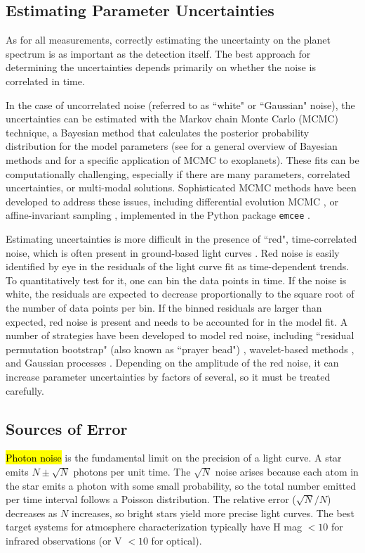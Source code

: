 \documentclass[graybox,natbib,nosecnum]{svmult}
\newcommand{\hbindex}[1]{\hl{#1}\index{#1}}  %
\begin{document}
\subsection{Estimating Parameter Uncertainties}
As for all measurements, correctly estimating the uncertainty on the planet spectrum is as important as the detection itself.  The best approach for determining the uncertainties depends primarily on whether the noise is correlated in time.  

In the case of uncorrelated noise (referred to as ``white" or ``Gaussian" noise), the uncertainties can be estimated with the Markov chain Monte Carlo (MCMC) technique, a Bayesian method that calculates the posterior probability distribution for the model parameters (see \citealt{sivia96} for a general overview of Bayesian methods and \citealt{ford05} for a specific application of MCMC to exoplanets). These fits can be computationally challenging, especially if there are many parameters, correlated uncertainties, or multi-modal solutions. Sophisticated MCMC methods have been developed to address these issues, including differential evolution MCMC \citep{braak06}, or affine-invariant sampling \citep{goodman10}, implemented in the Python package \texttt{emcee} \citep{foremanmackey13}.

Estimating uncertainties is more difficult in the presence of ``red", time-correlated noise, which is often present in ground-based light curves \citep{}. Red noise is easily identified by eye in the residuals of the light curve fit as time-dependent trends. To quantitatively test for it, one can bin the data points in time. If the noise is white, the residuals are expected to decrease proportionally to the square root of the number of data points per bin. If the binned residuals are larger than expected, red noise is present and needs to be accounted for in the model fit.  A number of strategies have been developed to model red noise, including ``residual permutation bootstrap" (also known as ``prayer bead")  \citep{southworth08}, wavelet-based methods \citep{carter09}, and Gaussian processes \citep{rasmussen05}. Depending on the amplitude of the red noise, it can increase parameter uncertainties by factors of several, so it must be treated carefully.

\subsection{Sources of Error}

\hbindex{Photon noise} is the fundamental limit on the precision of a light curve. A star emits $N \pm \sqrt{N}$ photons per unit time. The $\sqrt{N}$ noise arises because each atom in the star emits a photon with some small probability, so the total number emitted per time interval follows a Poisson distribution. The relative error ($\sqrt{N}/N$) decreases as $N$ increases, so bright stars yield more precise light curves.  The best target systems for atmosphere characterization typically have H mag $< 10$ for infrared observations (or V $< 10$ for optical).  
\end{document}
